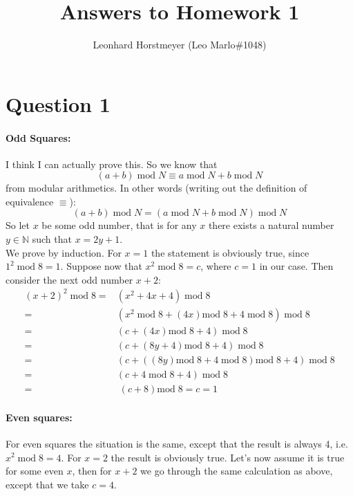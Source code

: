 \documentclass[a4paper,10pt]{article}
\title{Answers to Homework 1}
\author{Leonhard Horstmeyer (Leo Marlo\#1048)}
\begin{document}
\maketitle

\section*{Question 1}
\paragraph{Odd Squares:}
I think I can actually prove this.
So we know that 
\begin{equation}
(a+b) \;\text{mod} \;N \equiv a \;\text{mod}\; N + b \;\text{mod} \;N 
\end{equation}
from modular arithmetics. In other words (writing out the definition of equivalence $\equiv$):
\begin{equation}(a+b) \;\text{mod}\; N = \left( a \;\text{mod}\; N + b \;\text{mod}\; N\right) \;\text{mod}\; N
\end{equation}
So let $x$ be some odd number, that is for any $x$ there exists a natural number $y\in \mathbb N$ such that $x=2y+1$.\\
We prove by induction. For $x=1$ the statement is obviously true, since $1^2 \;\text{mod}\; 8 = 1$. Suppose now that $x^2 \;\text{mod}\; 8 = c$, where $c=1$ in our case. Then consider the next odd number $x+2$:
\begin{align}
(x+2)^2 \; \text{mod} \; 8 
=& \left(x^2 + 4x + 4\right)\;\text{mod} \; 8 \nonumber\\
=& \left(x^2\;\text{mod} \; 8 + \left(4x\right)\text{mod} \; 8 + 4 \;\text{mod} \; 8 \right)\;\text{mod} \; 8
\nonumber\\
=& \left( c + \left(4x\right)\text{mod} \; 8  + 4 \right) \;\text{mod} \; 8 \nonumber\\
=& \left( c + \left(8 y + 4\right)\text{mod} \; 8  + 4 \right) \;\text{mod} \; 8 \nonumber\\
=& \left( c + \left((8 y) \text{mod} \; 8  + 4 \;\text{mod} \; 8 \right)\text{mod} \; 8  + 4 \right) \;\text{mod} \; 8  \nonumber\\
=& \left( c + 4 \;\text{mod} \; 8 + 4 \right) \;\text{mod} \; 8 \nonumber\\
=& \;(c+8)\text{mod} \; 8  =  c = 1
\end{align}

\paragraph{Even squares:}
For even squares the situation is the same, except that the result is always 4, i.e. $x^2 \;\text{mod} \; 8 = 4$. For $x=2$ the result is obviously true. Let's now assume it is true for some even $x$, then for $x+2$ we go through the same calculation as above, except that we take $c=4$.
\end{document}
